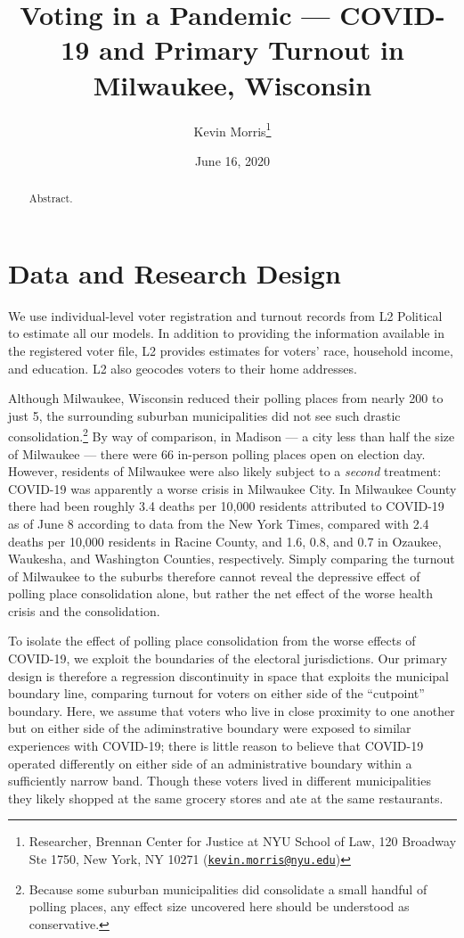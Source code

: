 \documentclass[
  12pt,
]{article}
\title{Voting in a Pandemic --- COVID-19 and Primary Turnout in Milwaukee, Wisconsin}
\author{Kevin Morris\footnote{Researcher, Brennan Center for Justice at NYU School of Law, 120 Broadway Ste 1750, New York, NY 10271 (\href{mailto:kevin.morris@nyu.edu}{\nolinkurl{kevin.morris@nyu.edu}})}}
\date{June 16, 2020}
\begin{document}
\maketitle
\begin{abstract}
Abstract.
\end{abstract}

\pagebreak

\doublespacing

\hypertarget{data-and-research-design}{%
\section*{Data and Research Design}\label{data-and-research-design}}

We use individual-level voter registration and turnout records from L2 Political to estimate all our models. In addition to providing the information available in the registered voter file, L2 provides estimates for voters' race, household income, and education. L2 also geocodes voters to their home addresses.

Although Milwaukee, Wisconsin reduced their polling places from nearly 200 to just 5, the surrounding suburban municipalities did not see such drastic consolidation.\footnote{Because some suburban municipalities did consolidate a small handful of polling places, any effect size uncovered here should be understood as conservative.} By way of comparison, in Madison --- a city less than half the size of Milwaukee --- there were 66 in-person polling places open on election day. However, residents of Milwaukee were also likely subject to a \emph{second} treatment: COVID-19 was apparently a worse crisis in Milwaukee City. In Milwaukee County there had been roughly 3.4 deaths per 10,000 residents attributed to COVID-19 as of June 8 according to data from the New York Times, compared with 2.4 deaths per 10,000 residents in Racine County, and 1.6, 0.8, and 0.7 in Ozaukee, Waukesha, and Washington Counties, respectively. Simply comparing the turnout of Milwaukee to the suburbs therefore cannot reveal the depressive effect of polling place consolidation alone, but rather the net effect of the worse health crisis and the consolidation.

To isolate the effect of polling place consolidation from the worse effects of COVID-19, we exploit the boundaries of the electoral jurisdictions. Our primary design is therefore a regression discontinuity in space that exploits the municipal boundary line, comparing turnout for voters on either side of the ``cutpoint'' boundary. Here, we assume that voters who live in close proximity to one another but on either side of the adiminstrative boundary were exposed to similar experiences with COVID-19; there is little reason to believe that COVID-19 operated differently on either side of an administrative boundary within a sufficiently narrow band. Though these voters lived in different municipalities they likely shopped at the same grocery stores and ate at the same restaurants.
\end{document}

